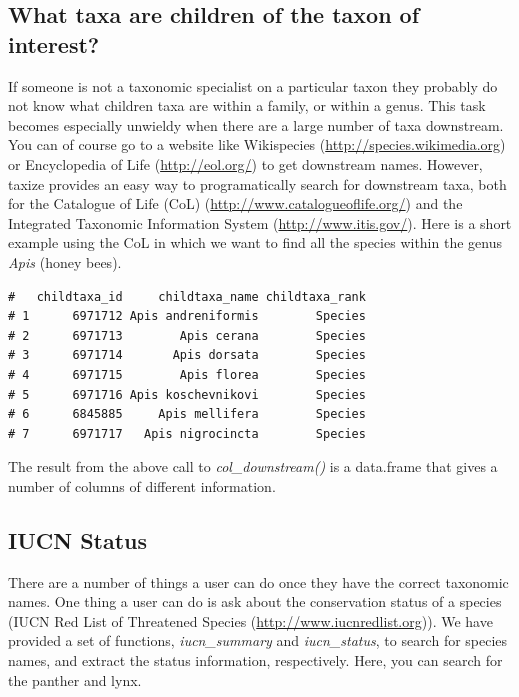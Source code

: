 \begin{sloppypar}
\subsection{What taxa are children of the taxon of interest?}
If someone is not a taxonomic specialist on a particular taxon they probably do not know what children taxa are within a family, or within a genus. 
This task becomes especially unwieldy when there are a large number of taxa downstream. 
You can of course go to a website like Wikispecies (\url{http://species.wikimedia.org}) or Encyclopedia of Life (\url{http://eol.org/}) to get downstream names. 
However, taxize provides an easy way to programatically search for downstream taxa, both for the Catalogue of Life (CoL) (\url{http://www.catalogueoflife.org/}) and the Integrated Taxonomic Information System (\url{http://www.itis.gov/}). 
Here is a short example using the CoL in which we want to find all the species within the genus \emph{Apis} (honey bees).

\begin{knitrout}
\small

\color{fgcolor}
\begin{kframe}
\begin{alltt}
\hlstd{(} \hlstd{=} \hlstd{,}  \hlstd{=} \hlstd{)[[}\hlstd{]]}
\end{alltt}
\begin{verbatim}
#   childtaxa_id     childtaxa_name childtaxa_rank
# 1      6971712 Apis andreniformis        Species
# 2      6971713        Apis cerana        Species
# 3      6971714       Apis dorsata        Species
# 4      6971715        Apis florea        Species
# 5      6971716 Apis koschevnikovi        Species
# 6      6845885     Apis mellifera        Species
# 7      6971717   Apis nigrocincta        Species
\end{verbatim}
\end{kframe}
\end{knitrout}

The result from the above call to \emph{col\_downstream()} is a data.frame that gives a number of columns of different information.


\subsection{IUCN Status}
There are a number of things a user can do once they have the correct taxonomic names. 
One thing a user can do is ask about the conservation status of a species (IUCN Red List of Threatened Species (\url{http://www.iucnredlist.org})). 
We have provided a set of functions, \emph{iucn\_summary} and \emph{iucn\_status}, to search for species names, and extract the status information, respectively. 
Here, you can search for the panther and lynx.


\end{sloppypar}
